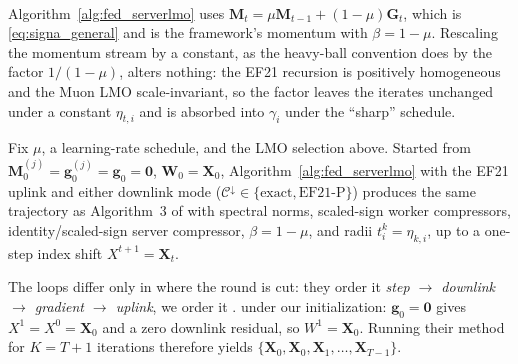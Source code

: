 \paragraph{}
Algorithm~\ref{alg:fed_serverlmo} uses $\mathbf{M}_t = \mu\mathbf{M}_{t-1} + (1-\mu)\mathbf{G}_t$, which is \eqref{eq:signa_general} and is the framework's momentum with $\beta = 1-\mu$. Rescaling the momentum stream by a constant, as the heavy-ball convention does by the factor $1/(1-\mu)$, alters nothing: the EF21 recursion is positively homogeneous and the Muon LMO scale-invariant, so the factor leaves the iterates unchanged under a constant $\eta_{t,i}$ and is absorbed into $\gamma_i$ under the ``sharp'' schedule. 

\begin{proposition}\label{prop:instance}
Fix $\mu$, a learning-rate schedule, and the LMO selection above. Started from $\mathbf{M}_0^{(j)} = \mathbf{g}_0^{(j)} = \mathbf{g}_0 = \mathbf{0}$, $\mathbf{W}_0 = \mathbf{X}_0$, Algorithm~\ref{alg:fed_serverlmo} with  the EF21 uplink and either downlink mode ($\mathcal{C}^{\downarrow} \in \{\text{exact},\text{EF21-P}\}$) produces the same trajectory as Algorithm~3 of \citet{gruntkowska2025error} with spectral norms, scaled-sign worker compressors, identity/scaled-sign server compressor, $\beta = 1-\mu$, and radii $t_i^k = \eta_{k,i}$, up to a one-step index shift $X^{t+1} = \mathbf{X}_t$.
\end{proposition}
\begin{paperproof}
The loops differ only in where the round is cut: they order it \emph{step $\to$ downlink $\to$ gradient $\to$ uplink}, we order it .  under our initialization: $\mathbf{g}_0 = \mathbf{0}$ gives $X^1 = X^0 = \mathbf{X}_0$ and a zero downlink residual, so $W^1 = \mathbf{X}_0$.  Running their method for $K = T+1$ iterations therefore yields $\{\mathbf{X}_0,\mathbf{X}_0,\mathbf{X}_1,\dots,\mathbf{X}_{T-1}\}$. 
\end{paperproof}

